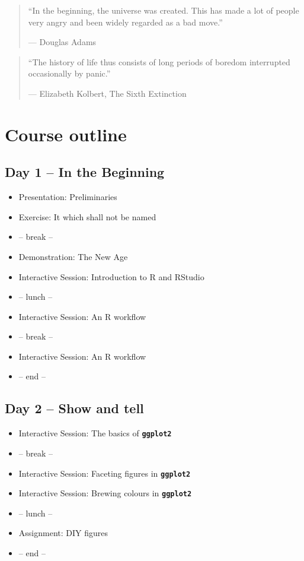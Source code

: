 \documentclass[]{book}
\providecommand{\tightlist}{%
  \setlength{\itemsep}{0pt}\setlength{\parskip}{0pt}}
\theoremstyle{definition}
\theoremstyle{definition}
\theoremstyle{definition}
\theoremstyle{remark}
\begin{document}
\begin{quote}
``In the beginning, the universe was created. This has made a lot of
people very angry and been widely regarded as a bad move.''

--- Douglas Adams
\end{quote}

\begin{quote}
``The history of life thus consists of long periods of boredom
interrupted occasionally by panic.''

--- Elizabeth Kolbert, The Sixth Extinction
\end{quote}

\section{Course outline}\label{course-outline}

\subsection*{Day 1 -- In the Beginning}\label{day-1-in-the-beginning}

\begin{itemize}
\tightlist
\item
  Presentation: Preliminaries
\item
  Exercise: It which shall not be named
\item
  -- break --
\item
  Demonstration: The New Age
\item
  Interactive Session: Introduction to R and RStudio
\item
  -- lunch --
\item
  Interactive Session: An R workflow
\item
  -- break --
\item
  Interactive Session: An R workflow
\item
  -- end --
\end{itemize}

\subsection*{Day 2 -- Show and tell}\label{day-2-show-and-tell}

\begin{itemize}
\tightlist
\item
  Interactive Session: The basics of \textbf{\texttt{ggplot2}}
\item
  -- break --
\item
  Interactive Session: Faceting figures in \textbf{\texttt{ggplot2}}
\item
  Interactive Session: Brewing colours in \textbf{\texttt{ggplot2}}
\item
  -- lunch --
\item
  Assignment: DIY figures
\item
  -- end --
\end{itemize}
\end{document}
